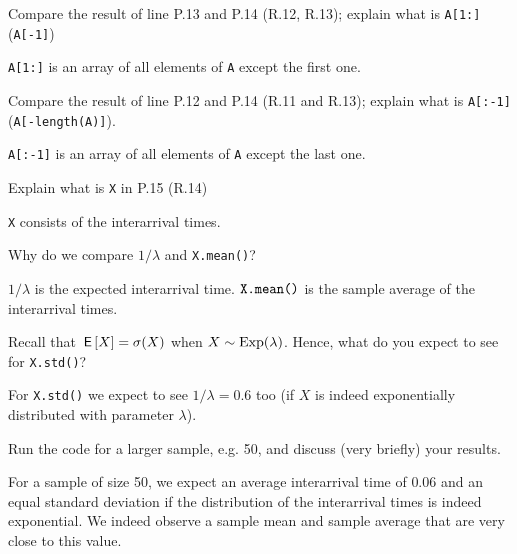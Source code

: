 \documentclass[assignments]{subfiles}
\begin{document}
\begin{exercise}
Compare the result of  line P.13 and P.14 (R.12, R.13);  explain what is \texttt{A[1:]} (\texttt{A[-1]})
\begin{solution}
\verb|A[1:]| is an array of all elements of \verb|A| except the first one.
\end{solution}
\end{exercise}

\begin{exercise}
Compare the result of  line P.12 and P.14 (R.11 and R.13);  explain what is \texttt{A[:-1]} (\texttt{A[-length(A)]}).
\begin{solution}
\verb|A[:-1]| is an array of all elements of \verb|A| except the last one.
\end{solution}
\end{exercise}

\begin{exercise}
 Explain what is \texttt{X} in P.15 (R.14)
\begin{solution}
\verb|X| consists of the interarrival times.
\end{solution}
\end{exercise}

\begin{exercise}
Why do we compare $1/\lambda$ and \texttt{X.mean()}?
\begin{solution}
$1/\lambda$ is the expected interarrival time. $\verb|X.mean()|$ is the sample average of the interarrival times.
\end{solution}
\end{exercise}

\begin{exercise}
Recall that $\,\mathsf{E}\left[X\right] = \sigma (X)$ when $X\sim \mathrm{Exp}(\lambda)$.
Hence, what do you expect to see for \texttt{X.std()}?
\begin{solution}
For \verb|X.std()| we expect to see $1/\lambda = 0.6$ too (if $X$ is indeed exponentially distributed with parameter $\lambda$).
\end{solution}
\end{exercise}

\begin{exercise}
 Run the code for a larger sample, e.g. 50, and discuss (very briefly) your results.
\begin{solution}
For a sample of size 50, we expect an average interarrival time of $0.06$ and an equal standard deviation if the distribution of the interarrival times is indeed exponential. We indeed observe a sample mean and sample average that are very close to this value.
\end{solution}
\end{exercise}
\end{document}

